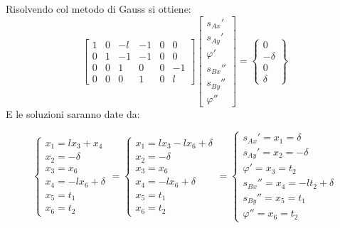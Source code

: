 \documentclass{article}
\begin{document}
\begin{adjustwidth}{2in}{}
Risolvendo col metodo di Gauss si ottiene: 
\[
\left[\begin{array}{cccccc}
	1 & 0 & -l & -1 & 0 & 0 \\
	0 & 1 & -1 & -1 & 0 & 0 \\
	0 & 0 & 1 & 0 & 0 & -1 \\
	0 & 0 & 0 & 1 & 0 & l
\end{array} \right] \left[ \begin{array}{c}
	s_{Ax}' \\
	s_{Ay}' \\
	\varphi' \\
	s_{Bx}'' \\
	s_{By}'' \\
	\varphi''
\end{array}\right] = \left\lbrace \begin{array}{c}
	0 \\
	-\delta \\
	0 \\
	\delta
\end{array} \right\rbrace 
\]	
 E le soluzioni saranno date da: 
 
 \[
 \begin{cases}
x_1 = lx_3 + x_4 \\
x_2 = -\delta \\
x_3 = x_6 \\
x_4 = -lx_6 + \delta \\
x_5 = t_1 \\
x_6 = t_2
 \end{cases} = \begin{cases}
 x_1 = lx_3 -lx_6 + \delta \\
 x_2 = -\delta \\
 x_3 = x_6 \\
 x_4 = -lx_6 + \delta \\
 x_5 = t_1 \\
 x_6 = t_2
\end{cases} = \begin{cases}
s_{Ax}' = x_1 =  \delta \\
s_{Ay}' = x_2 = -\delta \\
\varphi' = x_3 = t_2 \\
s_{Bx}'' = x_4 = -lt_2 + \delta \\
s_{By}'' = x_5 = t_1  \\
\varphi'' = x_6 = t_2 
\end{cases}
 \]
 

\end{adjustwidth}
\end{document}
